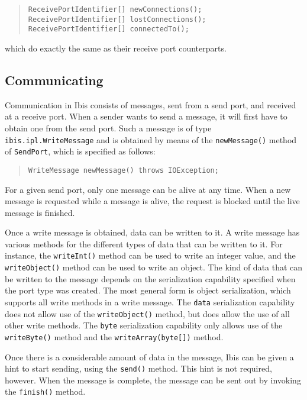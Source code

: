 \documentclass[10pt]{article}
\newcommand{\mysubsection}[1]{\subsection{#1}\label{#1}}
\begin{document}
{\small
\begin{quote}
\begin{verbatim}
ReceivePortIdentifier[] newConnections();
ReceivePortIdentifier[] lostConnections();
ReceivePortIdentifier[] connectedTo();
\end{verbatim}
\end{quote}
}
\noindent
which do exactly the same as their receive port counterparts.

\mysubsection{Communicating}

Communication in Ibis
consists of messages, sent from a send port, and received at a
receive port. When a sender wants to send a message, it will first
have to obtain one from the send port. Such a message is of
type \texttt{ibis.ipl.WriteMessage} and is obtained by means of
the \texttt{newMessage()} method of \texttt{SendPort}, which is specified
as follows:

{\small
\begin{quote}
\begin{verbatim}
WriteMessage newMessage() throws IOException;
\end{verbatim}
\end{quote}
}

\noindent
For a given send port, only one message can be alive at any time.
When a new message is requested while a message is alive, the request
is blocked until the live message is finished.

Once a write message is obtained, data can be written to it.
A write message has various methods for the different types of
data that can be written to it. For instance, the
\texttt{writeInt()} method can be used to write an integer value,
and the \texttt{writeObject()} method can be used to write an object.
The kind of data that can be written to the message depends on the
serialization capability specified when the port type was created.
The most general form is object serialization, which supports 
all write methods in a write message.
The \texttt{data} serialization capability does not allow use of the
\texttt{writeObject()} method, but does allow the use of all other write
methods. The \texttt{byte} serialization capability only allows use
of the \texttt{writeByte()} method and the \texttt{writeArray(byte[])}
method.

Once there is a considerable amount of data in the message, Ibis
can be given a hint to start sending, using the \texttt{send()}
method. This hint is not required, however. When the message is
complete, the message can be sent out by invoking the
\texttt{finish()} method.
\end{document}
